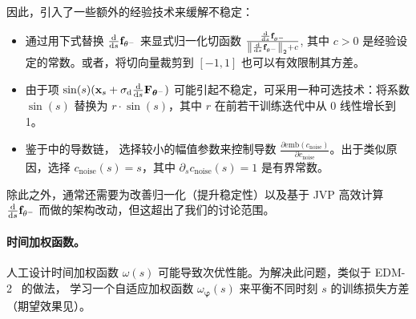 因此，引入了一些额外的经验技术来缓解不稳定：
\begin{itemize}
    \item {} 通过用下式替换 $\frac{\mathop{}\!\mathrm{d} }{\mathop{}\!\mathrm{d} s}{\mathbf{f}}_{\theta^-}$ 来显式归一化切函数
    $    \frac{\frac{\mathop{}\!\mathrm{d} }{\mathop{}\!\mathrm{d} s} {\mathbf{f}}_{\theta^-}}{\left\| \frac{\mathop{}\!\mathrm{d} }{\mathop{}\!\mathrm{d} s} {\mathbf{f}}_{\theta^-} \right\|_2 + c}$,
    其中 $c>0$ 是经验设定的常数。或者，将切向量裁剪到 $[-1, 1]$ 也可以有效限制其方差。
    \item {} 由于项 $\sin(s)({\mathbf{x}}_s + \sigma_{\mathrm{d}} \frac{\mathop{}\!\mathrm{d} }{\mathop{}\!\mathrm{d} s}{\mathbf{F}}_{\bm{\theta}^-})$ 可能引起不稳定，可采用一种可选技术：将系数 $\sin(s)$ 替换为 $r \cdot \sin(s)$，其中 $r$ 在前若干训练迭代中从 0 线性增长到 1。
    \item {} 鉴于中的导数链，\citet{lu2024simplifying} 选择较小的幅值参数来控制导数 $\frac{\partial \text{emb}(c_{\mathrm{noise}})}{\partial c_{\mathrm{noise}}}$。出于类似原因，选择 $c_{\mathrm{noise}}(s) = s$，其中 $\partial_s c_{\mathrm{noise}}(s)=1$ 是有界常数。
\end{itemize}
除此之外，通常还需要为改善归一化（提升稳定性）以及基于 JVP 高效计算 $\frac{\mathop{}\!\mathrm{d}}{\mathop{}\!\mathrm{d} s}{\mathbf{f}}_{\theta^-}$ 而做的架构改动，但这超出了我们的讨论范围。

\paragraph{时间加权函数。}
人工设计时间加权函数 $\omega(s)$ 可能导致次优性能。为解决此问题，类似于 EDM-2~\citep{karras2024analyzing} 的做法，\citet{lu2024simplifying} 学习一个自适应加权函数 $\omega_{\bm{\varphi}}(s)$ 来平衡不同时刻 $s$ 的训练损失方差（期望效果见）。


